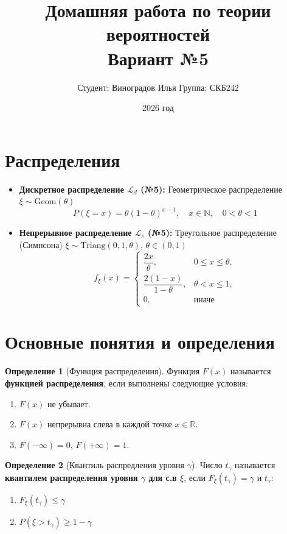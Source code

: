 \documentclass[12pt,a4paper]{article}
\theoremstyle{definition}
\newtheorem{definition}{Определение}[section]
\begin{document}
\title{Домашняя работа по теории вероятностей\\ Вариант №5}
\author{Студент: Виноградов Илья \quad Группа: СКБ242}
\date{2026 год}
\maketitle

\section{Распределения}
\begin{itemize}
    \item \textbf{Дискретное распределение $\mathscr{L}_d$ (№5):} Геометрическое распределение $\xi \sim \text{Geom}(\theta)$
    \[
    P(\xi = x) = \theta (1-\theta)^{x-1}, \quad x \in \mathbb{N}, \quad 0 < \theta < 1
    \]
    \item \textbf{Непрерывное распределение $\mathscr{L}_c$ (№5):} Треугольное распределение (Симпсона) $\xi \sim \text{Triang}(0,1,\theta)$, $\theta \in (0,1)$
    \[
    f_\xi(x) = 
    \begin{cases}
        \dfrac{2x}{\theta}, & 0 \le x \le \theta,\\[8pt]
        \dfrac{2(1-x)}{1-\theta}, & \theta < x \le 1,\\[8pt]
        0, & \text{иначе}
    \end{cases}
    \]
\end{itemize}

\renewcommand{\thesection}{1.\arabic{section}}
\setcounter{section}{0}
\section{Основные понятия и определения}

\begin{definition}[Функция распределения]
Функция $F(x)$ называется \textbf{функцией распределения}, если выполнены следующие условия:
\begin{enumerate}[label=\arabic*.]
    \item $F(x)$ не убывает.
    \item $F(x)$ непрерывна слева в каждой точке $x \in \mathbb{R}$.
    \item $F(-\infty) = 0$, $F(+\infty) = 1$.
\end{enumerate}
\end{definition}

\begin{definition}[Квантиль распредления уровня $\gamma$]
Число $t_{\gamma}$ называется \textbf{квантилем распределения уровня $\gamma$ для с.в $\xi$}, если {$F_\xi (t_\gamma) = \gamma$} и $t_{\gamma}$:
\begin{enumerate}[label=\arabic*.]
    \item $F_{\xi}(t_{\gamma}) \le \gamma$
    \item $P(\xi > t_{\gamma}) \ge 1 - \gamma$
\end{enumerate}
\end{definition}
\end{document}
